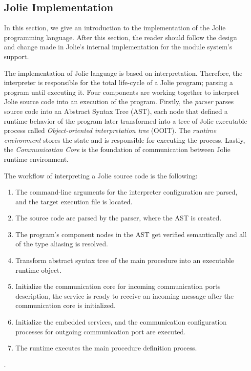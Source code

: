 \subsection{Jolie Implementation}
\label{sec:jolie-implementation}
In this section, we give an introduction to the implementation of the Jolie programming language. After this section, the reader should follow the design and change made in Jolie's internal implementation for the module system's support.

The implementation of Jolie language is based on interpretation. Therefore, the interpreter is responsible for the total life-cycle of a Jolie program; parsing a program until executing it. Four components are working together to interpret Jolie source code into an execution of the program. Firstly, the \textit{parser} parses source code into an Abstract Syntax Tree (AST), each node that defined a runtime behavior of the program later transformed into a tree of Jolie executable process called \textit{Object-oriented interpretation tree} (OOIT). The \textit{runtime environment} stores the state and is responsible for executing the process. Lastly, the  \textit{Communication Core} is the foundation of communication between Jolie runtime environment.


The workflow of interpreting a Jolie source code is the following:

\begin{enumerate}
    \item The command-line arguments for the interpreter configuration are parsed, and the target execution file is located.
    \item The source code are parsed by the parser, where the AST is created.
    \item The program's component nodes in the AST get verified semantically and all of the type aliasing is resolved.
    \item Transform abstract syntax tree of the main procedure into an executable runtime object.
    \item Initialize the communication core for incoming communication ports description, the service is ready to receive an incoming message after the communication core is initialized.
    \item Initialize the embedded services, and the communication configuration processes for outgoing communication port are executed.
    \item The runtime executes the main procedure definition process.
\end{enumerate}.

\FloatBarrier